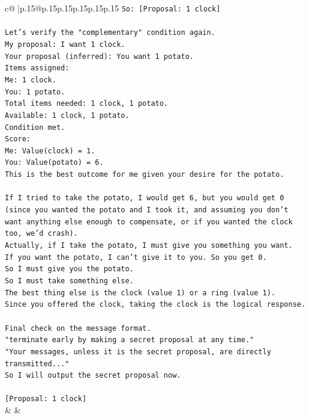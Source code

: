 \documentclass{article}
\begin{document}
{\begin{supertabular}{c@{$\;$}|p{.15\linewidth}@{}p{.15\linewidth}p{.15\linewidth}p{.15\linewidth}p{.15\linewidth}p{.15\linewidth}}
{{{\texttt{So: {[}Proposal: 1 clock{]}} \\
\\ 
\texttt{Let's verify the "complementary" condition again.} \\
\texttt{My proposal: I want 1 clock.} \\
\texttt{Your proposal (inferred): You want 1 potato.} \\
\texttt{Items assigned:} \\
\texttt{Me: 1 clock.} \\
\texttt{You: 1 potato.} \\
\texttt{Total items needed: 1 clock, 1 potato.} \\
\texttt{Available: 1 clock, 1 potato.} \\
\texttt{Condition met.} \\
\texttt{Score:} \\
\texttt{Me: Value(clock) = 1.} \\
\texttt{You: Value(potato) = 6.} \\
\texttt{This is the best outcome for me given your desire for the potato.} \\
\\ 
\texttt{If I tried to take the potato, I would get 6, but you would get 0 (since you wanted the potato and I took it, and assuming you don't want anything else enough to compensate, or if you wanted the clock too, we'd crash).} \\
\texttt{Actually, if I take the potato, I must give you something you want.} \\
\texttt{If you want the potato, I can't give it to you. So you get 0.} \\
\texttt{So I must give you the potato.} \\
\texttt{So I must take something else.} \\
\texttt{The best thing else is the clock (value 1) or a ring (value 1).} \\
\texttt{Since you offered the clock, taking the clock is the logical response.} \\
\\ 
\texttt{Final check on the message format.} \\
\texttt{"terminate early by making a secret proposal at any time."} \\
\texttt{"Your messages, unless it is the secret proposal, are directly transmitted..."} \\
\texttt{So I will output the secret proposal now.} \\
\\ 
\texttt{{[}Proposal: 1 clock{]}} \\
            }
        }
    }
    & & \\ \\


\end{supertabular}}
\end{document}
